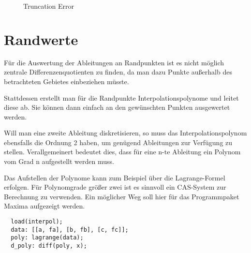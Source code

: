 \documentclass[11pt, ngerman,colorback,accentcolor=tud2d]{tudreport}
\begin{document}
\begin{figure}[h]
\caption{Truncation Error}
\end{figure}

\section{Randwerte}
\label{sec:Randwerte}

Für die Auswertung der Ableitungen an Randpunkten ist es nicht möglich zentrale Differenzenquotienten
zu finden, da man dazu Punkte außerhalb des betrachteten Gebietes einbeziehen müsste.

Stattdessen erstellt man für die Randpunkte Interpolationspolynome und leitet diese ab.
Sie können dann einfach an den gewünschten Punkten ausgewertet werden.

Will man eine zweite Ableitung diskretisieren, so muss das Interpolationspolynom
ebensfalls die Ordnung 2 haben, um genügend Ableitungen zur Verfügung zu stellen.
Verallgemeinert bedeutet dies, dass für eine n-te Ableitung ein Polynom vom Grad n
aufgestellt werden muss.

Das Aufstellen der Polynome kann zum Beispiel über die Lagrange-Formel erfolgen.
Für Polynomgrade größer zwei ist es sinnvoll ein CAS-System zur Berechnung zu verwenden.
Ein möglicher Weg soll hier für das Programmpaket Maxima aufgezeigt werden.

\begin{lstlisting}
  load(interpol);
  data: [[a, fa], [b, fb], [c, fc]];
  poly: lagrange(data);
  d_poly: diff(poly, x);
  
\end{lstlisting}
\end{document}
